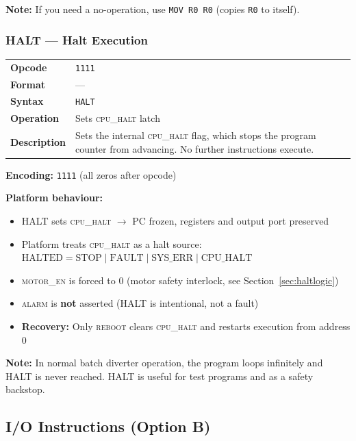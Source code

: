 \documentclass[11pt,a4paper]{article}
\newcommand{\reg}[1]{\texttt{R#1}}
\newcommand{\opcode}[1]{\texttt{#1}}
\newcommand{\signal}[1]{\textsc{#1}}
\begin{document}
\textbf{Note:} If you need a no-operation, use \lstinline|MOV R0 R0| (copies \reg{0} to itself).

\subsubsection{HALT --- Halt Execution}

\begin{table}[H]
\begin{tabularx}{\textwidth}{@{}lX@{}}
\toprule
\textbf{Opcode}      & \opcode{1111} \\
\textbf{Format}      & --- \\
\textbf{Syntax}      & \lstinline|HALT| \\
\textbf{Operation}   & Sets \signal{cpu\_halt} latch \\
\textbf{Description} & Sets the internal \signal{cpu\_halt} flag, which stops the program counter from advancing. No further instructions execute. \\
\bottomrule
\end{tabularx}
\end{table}

\textbf{Encoding:} \texttt{1111} (all zeros after opcode)

\textbf{Platform behaviour:}
\begin{itemize}[nosep]
  \item HALT sets \signal{cpu\_halt} $\rightarrow$ PC frozen, registers and output port preserved
  \item Platform treats \signal{cpu\_halt} as a halt source: $\text{HALTED} = \text{STOP} \mid \text{FAULT} \mid \text{SYS\_ERR} \mid \text{CPU\_HALT}$
  \item \signal{motor\_en} is forced to 0 (motor safety interlock, see Section~\ref{sec:haltlogic})
  \item \signal{alarm} is \textbf{not} asserted (HALT is intentional, not a fault)
  \item \textbf{Recovery:} Only \signal{reboot} clears \signal{cpu\_halt} and restarts execution from address 0
\end{itemize}

\textbf{Note:} In normal batch diverter operation, the program loops infinitely and HALT is never reached. HALT is useful for test programs and as a safety backstop.

\subsection{I/O Instructions (Option B)}\label{sec:io_instructions}
\end{document}
